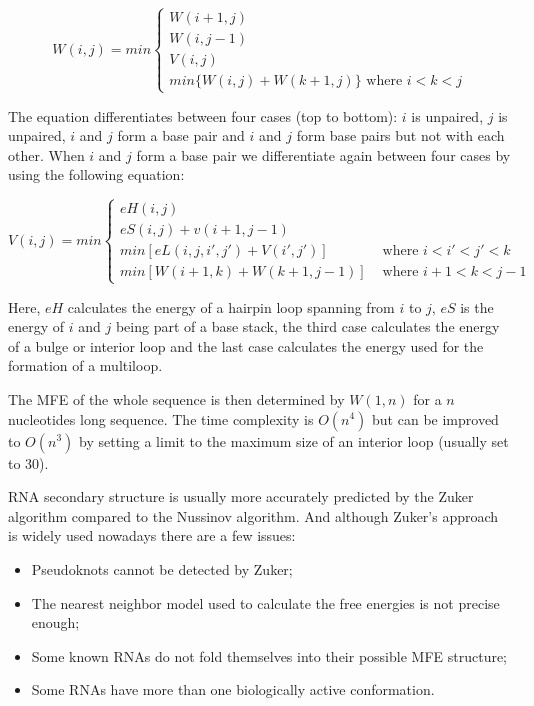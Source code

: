 \begin{equation*}
W(i,j) = min
\begin{cases}
	W(i+1,j) \\
	W(i,j-1) \\
	V(i,j) \\
	min\{W(i,j)+W(k+1,j)\} \text{ where $i<k<j$}
\end{cases}
\end{equation*}

The equation differentiates between four cases (top to bottom): $i$ is unpaired, $j$ is unpaired, $i$ and $j$ form a base pair and $i$ and $j$ form base pairs but not with each other. When $i$ and $j$ form a base pair we differentiate again between four cases by using the following equation:

\begin{equation*}
V(i,j) = min
\begin{cases}
	eH(i,j) \\
	eS(i,j) + v(i+1,j-1) \\
	min[eL(i,j,i',j') + V(i',j')] & \text{ where $i<i'<j'<k$} \\
	min[W(i+1,k)+W(k+1,j-1)] & \text{ where $i+1<k<j-1$}
\end{cases}
\end{equation*}

Here, $eH$ calculates the energy of a hairpin loop spanning from $i$ to $j$, $eS$ is the energy of $i$ and $j$ being part of a base stack, the third case calculates the energy of a bulge or interior loop and the last case calculates the energy used for the formation of a multiloop.

The MFE of the whole sequence is then determined by $W(1,n)$ for a $n$ nucleotides long sequence. The time complexity is $O(n^4)$ but can be improved to $O(n^3)$ by setting a limit to the maximum size of an interior loop (usually set to 30).   

RNA secondary structure is usually more accurately predicted by the Zuker algorithm compared to the Nussinov algorithm. And although Zuker's approach is widely used nowadays there are a few issues:
\begin{itemize}
	\item Pseudoknots cannot be detected by Zuker;
	\item The nearest neighbor model used to calculate the free energies is not precise enough;
	\item Some known RNAs do not fold themselves into their possible MFE structure;
	\item Some RNAs have more than one biologically active conformation.
\end{itemize}

